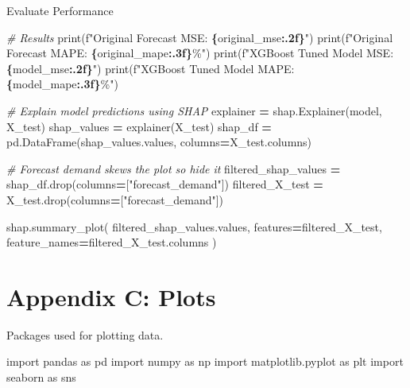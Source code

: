 \documentclass[mstat,12pt]{unswthesis}
\newenvironment{Shaded}{\begin{snugshade}}{\end{snugshade}}
\newcommand{\BuiltInTok}[1]{#1}
\newcommand{\CommentTok}[1]{\textcolor[rgb]{0.56,0.35,0.01}{\textit{#1}}}
\newcommand{\ImportTok}[1]{#1}
\newcommand{\NormalTok}[1]{#1}
\newcommand{\OperatorTok}[1]{\textcolor[rgb]{0.81,0.36,0.00}{\textbf{#1}}}
\newcommand{\SpecialCharTok}[1]{\textcolor[rgb]{0.81,0.36,0.00}{\textbf{#1}}}
\newcommand{\SpecialStringTok}[1]{\textcolor[rgb]{0.31,0.60,0.02}{#1}}
\newcommand{\StringTok}[1]{\textcolor[rgb]{0.31,0.60,0.02}{#1}}
\begin{document}
Evaluate Performance

\begin{Shaded}
\begin{Highlighting}[]
\CommentTok{\# Results}
\BuiltInTok{print}\NormalTok{(}\SpecialStringTok{f"Original Forecast MSE: }\SpecialCharTok{\{}\NormalTok{original\_mse}\SpecialCharTok{:.2f\}}\SpecialStringTok{"}\NormalTok{)}
\BuiltInTok{print}\NormalTok{(}\SpecialStringTok{f"Original Forecast MAPE: }\SpecialCharTok{\{}\NormalTok{original\_mape}\SpecialCharTok{:.3f\}}\SpecialStringTok{\%"}\NormalTok{)}
\BuiltInTok{print}\NormalTok{(}\SpecialStringTok{f"XGBoost Tuned Model MSE: }\SpecialCharTok{\{}\NormalTok{model\_mse}\SpecialCharTok{:.2f\}}\SpecialStringTok{"}\NormalTok{)}
\BuiltInTok{print}\NormalTok{(}\SpecialStringTok{f"XGBoost Tuned Model MAPE: }\SpecialCharTok{\{}\NormalTok{model\_mape}\SpecialCharTok{:.3f\}}\SpecialStringTok{\%"}\NormalTok{)}


\CommentTok{\# Explain model predictions using SHAP}
\NormalTok{explainer }\OperatorTok{=}\NormalTok{ shap.Explainer(model, X\_test)}
\NormalTok{shap\_values }\OperatorTok{=}\NormalTok{ explainer(X\_test)}
\NormalTok{shap\_df }\OperatorTok{=}\NormalTok{ pd.DataFrame(shap\_values.values, columns}\OperatorTok{=}\NormalTok{X\_test.columns)}

\CommentTok{\# Forecast demand skews the plot so hide it}
\NormalTok{filtered\_shap\_values }\OperatorTok{=}\NormalTok{ shap\_df.drop(columns}\OperatorTok{=}\NormalTok{[}\StringTok{"forecast\_demand"}\NormalTok{])}
\NormalTok{filtered\_X\_test }\OperatorTok{=}\NormalTok{ X\_test.drop(columns}\OperatorTok{=}\NormalTok{[}\StringTok{"forecast\_demand"}\NormalTok{])}

\NormalTok{shap.summary\_plot(}
\NormalTok{    filtered\_shap\_values.values,}
\NormalTok{    features}\OperatorTok{=}\NormalTok{filtered\_X\_test,}
\NormalTok{    feature\_names}\OperatorTok{=}\NormalTok{filtered\_X\_test.columns}
\NormalTok{)}
\end{Highlighting}
\end{Shaded}

\section*{Appendix C: Plots}\label{appendix-c-plots}

Packages used for plotting data.

\begin{Shaded}
\begin{Highlighting}[]
\ImportTok{import}\NormalTok{ pandas }\ImportTok{as}\NormalTok{ pd}
\ImportTok{import}\NormalTok{ numpy }\ImportTok{as}\NormalTok{ np}
\ImportTok{import}\NormalTok{ matplotlib.pyplot }\ImportTok{as}\NormalTok{ plt}
\ImportTok{import}\NormalTok{ seaborn }\ImportTok{as}\NormalTok{ sns}
\end{Highlighting}
\end{Shaded}
\end{document}
